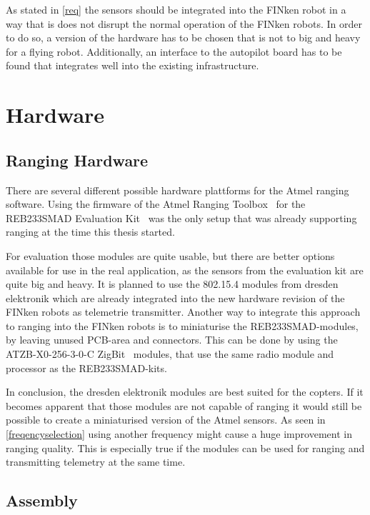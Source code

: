 
As stated in \autoref{req} the sensors should be integrated into the FINken robot in a way that is does not disrupt the normal operation of the FINken robots.
In order to do so, a version of the hardware has to be chosen that is not to big and heavy for a flying robot.
Additionally, an interface to the autopilot board has to be found that integrates well into the existing infrastructure.

\section{Hardware}

\subsection{Ranging Hardware}
\label{ranginghardware}

There are several different possible hardware plattforms for the Atmel ranging software.
Using the firmware of the Atmel Ranging Toolbox~\cite{atmelrtb} for the REB233SMAD Evaluation Kit~\cite{REB233SMAD} was the only setup that was already supporting ranging at the time this thesis started.

For evaluation those modules are quite usable, but there are better options available for use in the real application, as the sensors from the evaluation kit are quite big and heavy.
It is planned to use the 802.15.4 modules from dresden elektronik which are already integrated into the new hardware revision of the FINken robots as telemetrie transmitter.
Another way to integrate this approach to ranging into the FINken robots is to miniaturise the REB233SMAD-modules, by leaving unused PCB-area and connectors.
This can be done by using the ATZB-X0-256-3-0-C ZigBit~\cite{atmelzigbit} modules, that use the same radio module and processor as the REB233SMAD-kits.

In conclusion, the dresden elektronik modules are best suited for the copters.
If it becomes apparent that those modules are not capable of ranging it would still be possible to create a miniaturised version of the Atmel sensors.
As seen in \autoref{freqencyselection} using another frequency might cause a huge improvement in ranging quality.
This is especially true if the modules can be used for ranging and transmitting telemetry at the same time.

\subsection{Assembly}

